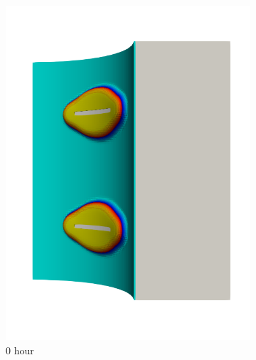 \begin{figure}[!htb]
  \begin{subfigure}[b]{0.2\textwidth}
    \centering
    \includegraphics[width=\textwidth]{Chapter5/figures/spallation/seed_c_4}
    \caption{0 hour}
  \end{subfigure}
  \begin{subfigure}[b]{0.2\textwidth}
    \centering

\end{subfigure}
\end{figure}
